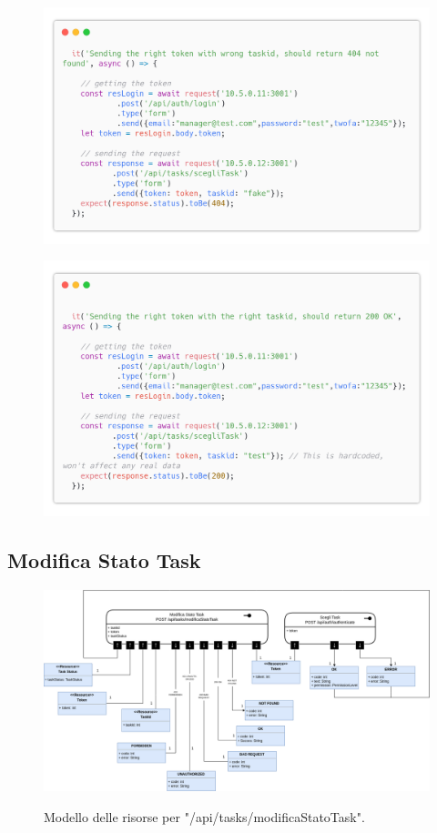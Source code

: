 \documentclass{report}
\begin{document}
\begin{figure}[H]
	\centering\includegraphics[width=1\textwidth]{images/code_scegli_task_test5.png}
\end{figure}
\begin{figure}[H]
	\centering\includegraphics[width=1\textwidth]{images/code_scegli_task_test6.png}
\end{figure}



\subsection*{Modifica Stato Task}


\begin{figure}[H]
	\centering\includegraphics[width=1\textwidth]{images/model_modifica_task.png}
	
	Modello delle risorse per "/api/tasks/modificaStatoTask".
\end{figure}
\end{document}
